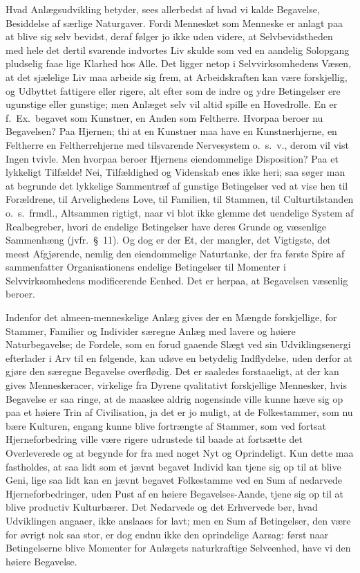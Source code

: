 \documentclass[12pt]{book}
\newcommand{\apage}[1]{\marginnote{\footnotesize\textit{[#1]}}}
\begin{document}
Hvad Anlægsudvikling betyder, sees allerbedst af hvad vi kalde Begavelse,
Besiddelse af særlige Naturgaver. Fordi Mennesket som Menneske er anlagt
paa at blive sig selv bevidst, deraf følger jo ikke uden videre, at
Selvbevidstheden med hele det dertil svarende indvortes Liv skulde som ved
en aandelig Solopgang pludselig faae lige Klarhed hos Alle. Det ligger
netop \apage{210} i Selvvirksomhedens Væsen, at det sjælelige Liv maa arbeide sig frem,
at Arbeidskraften kan være forskjellig, og Udbyttet fattigere eller rigere,
alt efter som de indre og ydre Betingelser ere ugunstige eller gunstige;
men Anlæget selv vil altid spille en Hovedrolle. En er f.\ Ex.\ begavet som
Kunstner, en Anden som Feltherre. Hvorpaa beroer nu Begavelsen? Paa Hjernen;
thi at en Kunstner maa have en Kunstnerhjerne, en Feltherre en
Feltherrehjerne med tilsvarende Nervesystem o.\ s.\ v., derom vil vist Ingen
tvivle. Men hvorpaa beroer Hjernens eiendommelige Disposition? Paa et
lykkeligt Tilfælde! Nei, Tilfældighed og Videnskab enes ikke heri; saa
søger man at begrunde det lykkelige Sammentræf af gunstige Betingelser ved
at vise hen til Forældrene, til Arvelighedens Love, til Familien, til
Stammen, til Culturtilstanden o.\ s.\ frmdl., Altsammen rigtigt, naar vi blot
ikke glemme det uendelige System af Realbegreber, hvori de endelige
Betingelser have deres Grunde og væsenlige Sammenhæng (jvfr.\ §\ 11). Og
dog er der Et, der mangler, det Vigtigste, det meest Afgjørende, nemlig den
eiendommelige Naturtanke, der fra første Spire af sammenfatter
Organisationens endelige Betingelser til Momenter i Selvvirksomhedens
modificerende Eenhed. Det er herpaa, at Begavelsen væsenlig beroer.

Indenfor det almeen-menneskelige Anlæg gives der en Mængde forskjellige,
for Stammer, Familier og Individer særegne Anlæg med lavere og høiere
Naturbegavelse; de Fordele, som en forud gaaende Slægt ved sin
Udviklingsenergi efterlader i Arv til en  \apage{211} følgende, kan udøve en betydelig
Indflydelse, uden derfor at gjøre den særegne Begavelse overflødig. Det er
saaledes forstaaeligt, at der kan gives Menneskeracer, virkelige fra
Dyrene qvalitativt forskjellige Mennesker, hvis Begavelse er saa ringe, at
de maaskee aldrig nogensinde ville kunne hæve sig op paa et høiere Trin af
Civilisation, ja det er jo muligt, at de Folkestammer, som nu bære
Kulturen, engang kunne blive fortrængte af Stammer, som ved fortsat
Hjerneforbedring ville være rigere udrustede til baade at fortsætte det
Overleverede og at begynde for fra med noget Nyt og Oprindeligt. Kun dette
maa fastholdes, at saa lidt som et jævnt begavet Individ kan tjene sig op
til at blive Geni, lige saa lidt kan en jævnt begavet Folkestamme ved en
Sum af nedarvede Hjerneforbedringer, uden Pust af en høiere
Begavelses-Aande, tjene sig op til at blive productiv Kulturbærer. Det
Nedarvede og det Erhvervede bør, hvad Udviklingen angaaer, ikke anslaaes
for lavt; men en Sum af Betingelser, den være for øvrigt nok saa stor, er
dog endnu ikke den oprindelige Aarsag: først naar Betingelserne blive
Momenter for Anlægets naturkraftige Selveenhed, have vi den høiere
Begavelse.
\end{document}
